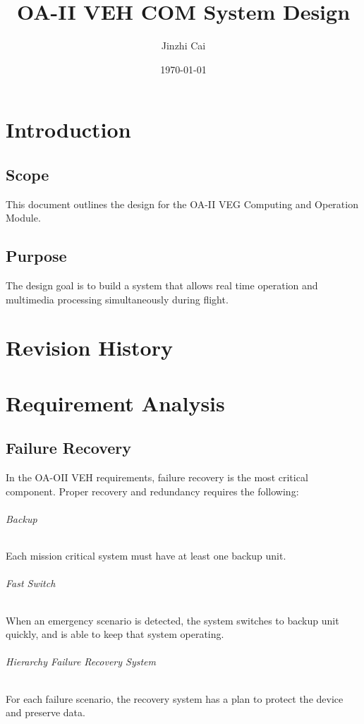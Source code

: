 \documentclass[12pt,article]{memoir}
\title{OA-II VEH COM System Design}
\author{Jinzhi Cai}
\date{\today}
\begin{document}
	


\tableofcontents*
\clearpage



\chapter{Introduction}
\section{Scope}
This document outlines the design for the OA-II VEG Computing and Operation Module.
\section{Purpose}
The design goal is to build a system that allows real time operation and multimedia processing simultaneously during flight.
\chapter{Revision History}
\begin{table}[H]
	\centering
	\caption{Summary of Revision History}
	\label{tab:rev}
\end{table}
\newpage
\chapter{Requirement Analysis}
\section{Failure Recovery}
In the OA-OII VEH requirements, failure recovery is the most critical component. Proper recovery and redundancy requires the following:

\subparagraph{Backup}Each mission critical system must have at least one backup unit.
\subparagraph{Fast Switch} When an emergency scenario is detected, the system switches to backup unit quickly, and is able to keep that system operating.
\subparagraph{Hierarchy Failure Recovery System} For each failure scenario, the recovery system has a plan to protect the device and preserve data.
\end{document}
